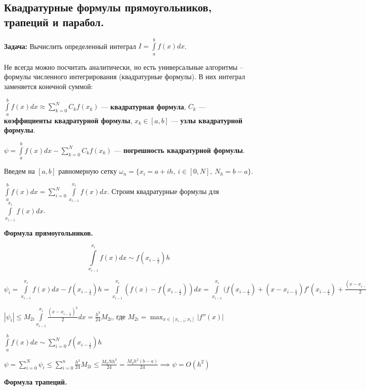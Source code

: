 \subsection{Квадратурные формулы прямоугольников, трапеций и парабол.}

\textbf{Задача:} Вычислить определенный интеграл $I = \int\limits_a^b f(x)dx$.

Не всегда можно посчитать аналитически, но есть универсальные алгоритмы -- формулы численного интегрирования (квадратурные формулы). 
В них интеграл заменяется конечной суммой:

$ \int\limits_a^b f(x)dx \approx\displaystyle\sum_{k=0}^N C_k f(x_k)$ --- \textbf{квадратурная формула}, 
$C_k$ --- \textbf{коэффициенты квадратурной формулы}, 
$x_k \in [a, b]$ --- \textbf{узлы квадратурной формулы}.

$\psi = \int\limits_a^b f(x)dx - \sum_{k=0}^N C_k f(x_k) $ --- \textbf{погрешность квадратурной формулы}. 

Введем на $[a,b]$ равномерную сетку $\omega_n = \{x_i =a+ih,~i\in[0,N],~N_h=b-a \}$.

$\int\limits_a^b f(x)dx = \displaystyle\sum_{i=0}^N\int\limits_{x_{i-1}}^{x_i} f(x)dx$. Строим квадратурные формулы для $\int\limits_{x_{i-1}}^{x_i} f(x)dx$.

\textbf{Формула прямоугольников.}

$$ \int\limits_{x_{i-1}}^{x_i} f(x)dx \sim f \left( x_{i-\frac{1}{2}} \right) h $$

$\psi_i = \int\limits_{x_{i-1}}^{x_i} f(x)dx - f \left( x_{i-\frac{1}{2}} \right)h = 
\int\limits_{x_{i-1}}^{x_i} \left( f(x) - f\left(x_{i-\frac{1}{2}} \right) \right)dx = 
\int\limits_{x_{i-1}}^{x_i} 
\Biggl( 
    f(x_{i-\frac{1}{2}}) + 
    (x - x_{i-\frac{1}{2}})f'(x_{i-\frac{1}{2}}) + 
    \frac{\left(x - x_{i-\frac{1}{2}}\right)^2}{2}f''(\xi) 
    \Biggr|_{\xi \in [x_{i-1};x_i]} - 
    f(x_{i-\frac{1}{2}}) 
\Biggr) dx$

$|\psi_i| \leqslant 
M_{2i} \int\limits_{x_{i-1}}^{x_i} \frac{ \left(x - x_{i-\frac{1}{2}} \right)^2}{2}dx = 
\frac{h^3}{24} M_{2i}$, где $ M_{2i} = \displaystyle\max_{x\in[x_{i-1};x_i]}|f''(x)|$

$\int\limits_a^b f(x)dx \sim \displaystyle\sum_{i=0}^N f(x_{i-\frac{1}{2}})h$

$\psi = \displaystyle\sum_{i=0}^N \psi_i \leqslant \displaystyle\sum_{i=0}^n \frac{h^3}{24} M_{2i}\leqslant \frac{M_2Nh^3}{24} = \frac{M_2h^2(b-a)}{24} \implies \psi = O(h^2)$

\textbf{Формула трапеций.}

